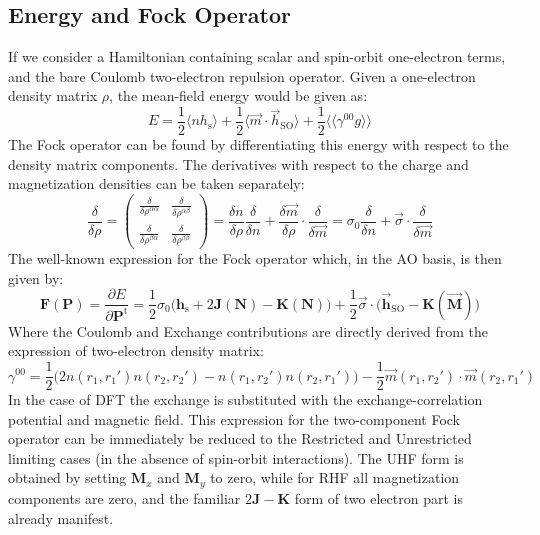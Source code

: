 \documentclass[12pt]{article}
\newcommand{\pfrac}[2]{\frac{\partial #1}{\partial #2}} 				%
\newcommand{\ev}[1]{\langle #1 \rangle}
\newcommand{\evv}[1]{\langle\langle #1 \rangle\rangle}
\begin{document}
\subsection{Energy and Fock Operator}
If we consider a Hamiltonian containing scalar and spin-orbit one-electron terms, and the bare Coulomb two-electron repulsion operator.
Given a one-electron density matrix $\rho$, the mean-field energy would be given as:
\begin{equation}
 E = \frac{1}{2}\ev{nh_\mathrm{s}} + \frac{1}{2}\ev{\vec{m}\cdot\vec{h}_\mathrm{SO}} + \frac{1}{2}\evv{\gamma^{00}g}
\end{equation}
The Fock operator can be found by differentiating this energy with respect to the density matrix components.
The derivatives with respect to the charge and magnetization densities can be taken separately:
\begin{equation}
\label{eq:DenDer}
 \frac{\delta}{\delta\rho} = 
  \begin{pmatrix} \frac{\delta}{\delta\rho^{\alpha\alpha}} & \frac{\delta}{\delta\rho^{\alpha\beta}} \\
                  \frac{\delta}{\delta\rho^{\beta\alpha}}  & \frac{\delta}{\delta\rho^{\beta\beta}} \end{pmatrix} =
  \frac{\delta n}{\delta\rho}\frac{\delta}{\delta n} + \frac{\delta \vec{m}}{\delta\rho}\cdot\frac{\delta}{\delta \vec{m}} = 
    \sigma_0\frac{\delta}{\delta n} + \vec{\sigma}\cdot\frac{\delta}{\delta\vec{m}}
\end{equation}
The well-known expression for the Fock operator which, in the AO basis, is then given by:
\begin{equation}
 \mathbf{F}(\mathbf{P}) = \pfrac{E}{\mathbf{P}^\mathrm{t}} = \frac{1}{2}\sigma_0\big(\mathbf{h}_\mathrm{s} + 2\mathbf{J}(\mathbf{N}) - \mathbf{K}(\mathbf{N})\big) +
  \frac{1}{2}\vec{\sigma}\cdot\big(\vec{\mathbf{h}}_\mathrm{SO} - \mathbf{K}(\vec{\mathbf{M}})\big)
\end{equation}
Where the Coulomb and Exchange contributions are directly derived from the expression of two-electron density matrix:
\begin{equation}
 \gamma^{00} = \frac{1}{2}\big(2n(r_1,r_1')n(r_2,r_2')-n(r_1,r_2')n(r_2,r_1')\big) - \frac{1}{2}\vec{m}(r_1,r_2')\cdot\vec{m}(r_2,r_1') 
\end{equation}
In the case of DFT the exchange is substituted with the exchange-correlation potential and magnetic field.
This expression for the two-component Fock operator can be immediately be reduced to the Restricted and Unrestricted limiting cases (in the absence of spin-orbit interactions).
The UHF form is obtained by setting $\mathbf{M}_x$ and $\mathbf{M}_y$ to zero, while for RHF all magnetization components are zero, and the familiar $2\mathbf{J} - \mathbf{K}$ form of two electron part is already manifest.
\end{document}
